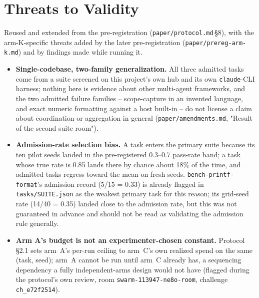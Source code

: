 \section{Threats to Validity}
\label{sec:threats}

Reused and extended from the pre-registration (\texttt{paper/protocol.md}\,\S8), with the arm-K-specific
threats added by the later pre-registration (\texttt{paper/prereg-arm-k.md}) and by findings made while
running it.

\begin{itemize}

\item \textbf{Single-codebase, two-family generalization.} All three admitted tasks come from a suite
  screened on this project's own hub and its own \texttt{claude}-CLI harness; nothing here is evidence
  about other multi-agent frameworks, and the two admitted failure families -- scope-capture in an
  invented language, and exact numeric formatting against a host built-in -- do not license a claim
  about coordination or aggregation in general (\texttt{paper/amendments.md}, "Result of the second
  suite room").

\item \textbf{Admission-rate selection bias.} A task enters the primary suite because its ten pilot
  seeds landed in the pre-registered 0.3--0.7 pass-rate band; a task whose true rate is 0.85 lands there
  by chance about 18\% of the time, and admitted tasks regress toward the mean on fresh seeds.
  \texttt{bench-printf-format}'s admission record (5/15 = 0.33) is already flagged in
  \texttt{tasks/SUITE.json} as the weakest primary task for this reason; its grid-seed rate (14/40 =
  0.35) landed close to the admission rate, but this was not guaranteed in advance and should not be
  read as validating the admission rule generally.

\item \textbf{Arm A's budget is not an experimenter-chosen constant.} Protocol \S2.1 sets arm~A's
  per-run ceiling to arm~C's own realized spend on the same (task, seed); arm~A cannot be run until
  arm~C already has, a sequencing dependency a fully independent-arms design would not have (flagged
  during the protocol's own review, room \texttt{swarm-113947-ne8o-room}, challenge
  \texttt{ch\_e72f2514}).


\end{itemize}
